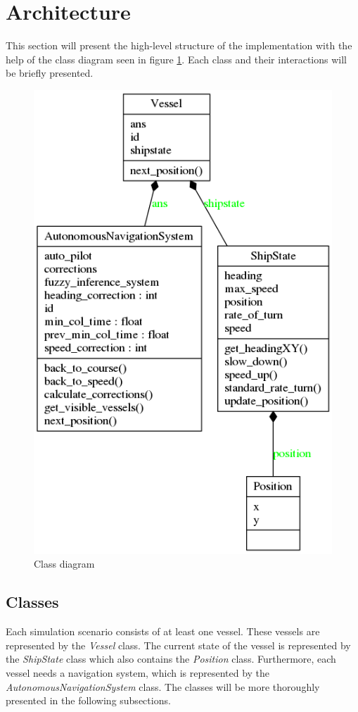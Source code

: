 \section{Architecture}
This section will present the high-level structure of the implementation with the help of the class diagram seen in figure \ref{fig:class_diagram}. Each class and their interactions will be briefly presented.
\begin{figure}[H]
    \centering
    \includegraphics[width=\textwidth,height=0.75\textheight,keepaspectratio]{../src/classes_Pyreverse}
    \caption{Class diagram}
    \label{fig:class_diagram}
\end{figure}
\subsection{Classes}
Each simulation scenario consists of at least one vessel. These vessels are represented by the \textit{Vessel} class. The current state of the vessel is represented by the \textit{ShipState} class which also contains the \textit{Position} class. Furthermore, each vessel needs a navigation system, which is represented by the \textit{AutonomousNavigationSystem} class. The classes will be more thoroughly presented in the following subsections.
